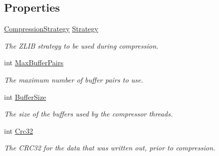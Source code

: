 \subsection*{Properties}
\begin{DoxyCompactItemize}
\item 
\mbox{\label{class_super_tiled2_unity_1_1_ionic_1_1_zlib_1_1_parallel_deflate_output_stream_a9e2b8d65b9f2c1a74a72516a30775f62}} 
\mbox{\hyperlink{namespace_super_tiled2_unity_1_1_ionic_1_1_zlib_abde5c10a1e2ee453e1e8e22e79a39a3b}{Compression\+Strategy}} \mbox{\hyperlink{class_super_tiled2_unity_1_1_ionic_1_1_zlib_1_1_parallel_deflate_output_stream_a9e2b8d65b9f2c1a74a72516a30775f62}{Strategy}}
\begin{DoxyCompactList}\small\item\em The Z\+L\+IB strategy to be used during compression. \end{DoxyCompactList}\item 
int \mbox{\hyperlink{class_super_tiled2_unity_1_1_ionic_1_1_zlib_1_1_parallel_deflate_output_stream_af01b47be83fda8e9e04a009ef8b4b7f2}{Max\+Buffer\+Pairs}}
\begin{DoxyCompactList}\small\item\em The maximum number of buffer pairs to use. \end{DoxyCompactList}\item 
int \mbox{\hyperlink{class_super_tiled2_unity_1_1_ionic_1_1_zlib_1_1_parallel_deflate_output_stream_acf40fcb2a35fc142e82004ae56761496}{Buffer\+Size}}
\begin{DoxyCompactList}\small\item\em The size of the buffers used by the compressor threads. \end{DoxyCompactList}\item 
int \mbox{\hyperlink{class_super_tiled2_unity_1_1_ionic_1_1_zlib_1_1_parallel_deflate_output_stream_aef89f86f7b962642a3b3273883c58755}{Crc32}}
\begin{DoxyCompactList}\small\item\em The C\+R\+C32 for the data that was written out, prior to compression. \end{DoxyCompactList}\item 

\end{DoxyCompactItemize}
